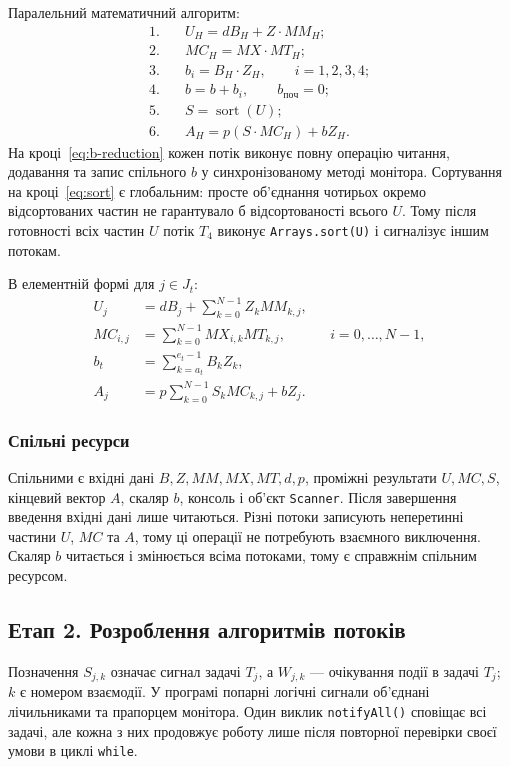 \documentclass[12pt,a4paper]{article}
\begin{document}
Паралельний математичний алгоритм:
\begin{align}
1.\quad &U_H=dB_H+Z\cdot MM_H; \label{eq:u-h}\\
2.\quad &MC_H=MX\cdot MT_H; \label{eq:mc-h}\\
3.\quad &b_i=B_H\cdot Z_H,\qquad i=1,2,3,4; \label{eq:bi}\\
4.\quad &b=b+b_i,\qquad b_{\mathrm{поч}}=0; \label{eq:b-reduction}\\
5.\quad &S=\operatorname{sort}(U); \label{eq:sort}\\
6.\quad &A_H=p(S\cdot MC_H)+bZ_H. \label{eq:a-h}
\end{align}
На кроці~\eqref{eq:b-reduction} кожен потік виконує повну операцію
читання, додавання та запис спільного $b$ у синхронізованому методі
монітора. Сортування на кроці~\eqref{eq:sort} є глобальним: просте
об’єднання чотирьох окремо відсортованих частин не гарантувало б
відсортованості всього $U$. Тому після готовності всіх частин $U$ потік
$T_4$ виконує \texttt{Arrays.sort(U)} і сигналізує іншим потокам.

В елементній формі для $j\in J_t$:
\begin{align}
 U_j &= dB_j+\sum_{k=0}^{N-1}Z_kMM_{k,j},\\
 MC_{i,j} &= \sum_{k=0}^{N-1}MX_{i,k}MT_{k,j},
 &&i=0,\ldots,N-1,\\
 b_t &= \sum_{k=a_t}^{e_t-1}B_kZ_k,\\
 A_j &= p\sum_{k=0}^{N-1}S_kMC_{k,j}+bZ_j.
\end{align}

\subsubsection*{Спільні ресурси}
Спільними є вхідні дані $B,Z,MM,MX,MT,d,p$, проміжні результати
$U,MC,S$, кінцевий вектор $A$, скаляр $b$, консоль і об’єкт
\texttt{Scanner}. Після завершення введення вхідні дані лише читаються.
Різні потоки записують неперетинні частини $U$, $MC$ та $A$, тому ці
операції не потребують взаємного виключення. Скаляр $b$ читається і
змінюється всіма потоками, тому є справжнім спільним ресурсом.

\subsection{Етап 2. Розроблення алгоритмів потоків}
Позначення $S_{j,k}$ означає сигнал задачі $T_j$, а $W_{j,k}$ ---
очікування події в задачі $T_j$; $k$ є номером взаємодії. У програмі
попарні логічні сигнали об’єднані лічильниками та прапорцем монітора.
Один виклик \texttt{notifyAll()} сповіщає всі задачі, але кожна з них
продовжує роботу лише після повторної перевірки своєї умови в циклі
\texttt{while}.
\end{document}
